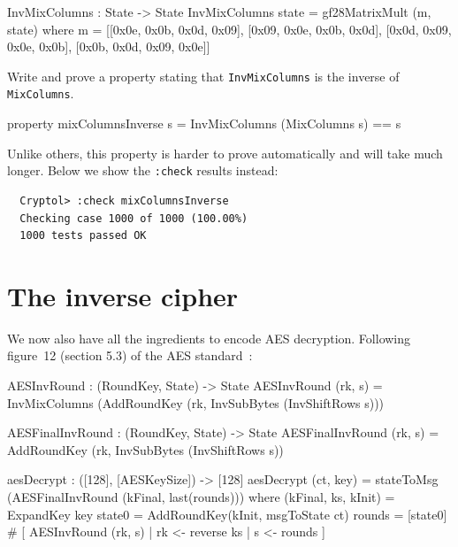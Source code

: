 \begin{code}
  InvMixColumns : State -> State
  InvMixColumns state = gf28MatrixMult (m, state)
    where m = [[0x0e, 0x0b, 0x0d, 0x09],
               [0x09, 0x0e, 0x0b, 0x0d],
               [0x0d, 0x09, 0x0e, 0x0b],
               [0x0b, 0x0d, 0x09, 0x0e]]
\end{code}

\begin{Exercise}\label{ex:aesimc:0}
  Write and prove a property stating that {\tt InvMixColumns} is the
  inverse of {\tt MixColumns}.
\end{Exercise}
\begin{Answer}
\begin{code}
  property mixColumnsInverse s = InvMixColumns (MixColumns s) == s
\end{code}
Unlike others, this property is harder to prove automatically and will
take much longer. Below we show the {\tt :check} results instead:
\begin{Verbatim}
  Cryptol> :check mixColumnsInverse
  Checking case 1000 of 1000 (100.00%) 
  1000 tests passed OK
\end{Verbatim}

\end{Answer}

\section{The inverse cipher}
\label{sec:inverse-cipher}

We now also have all the ingredients to encode AES decryption.
Following figure~12 (section 5.3) of the AES\indAES
standard~\cite{aes}: {\small
\begin{code}
  AESInvRound : (RoundKey, State) -> State
  AESInvRound (rk, s) =
    InvMixColumns (AddRoundKey (rk, InvSubBytes (InvShiftRows s)))

  AESFinalInvRound : (RoundKey, State) -> State
  AESFinalInvRound (rk, s) = AddRoundKey (rk, InvSubBytes (InvShiftRows s))

  aesDecrypt : ([128], [AESKeySize]) -> [128]
  aesDecrypt (ct, key) = stateToMsg (AESFinalInvRound (kFinal, last(rounds)))
    where
      (kFinal, ks, kInit) = ExpandKey key
      state0 = AddRoundKey(kInit, msgToState ct)
      rounds = [state0] # [ AESInvRound (rk, s) 
                          | rk <- reverse ks
                          | s  <- rounds
                          ]
\end{code}
}

